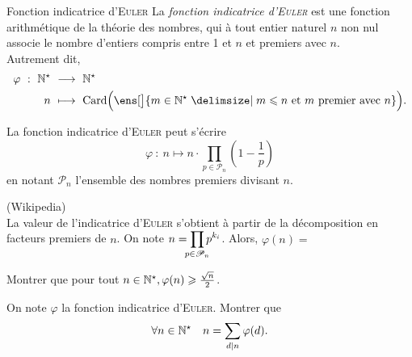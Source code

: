 \begin{defi}{Fonction indicatrice d'\textsc{Euler}}
    La \emph{fonction indicatrice d'\textsc{Euler}} est une fonction arithmétique de la théorie des nombres, qui à tout entier naturel $n$ non nul associe le nombre d'entiers compris entre 1 et $n$ et premiers avec $n$. \\
    Autrement dit, 
    \begin{alignat*}{2}
        \varphi\ :\ \Ne\ &\longrightarrow\ \Ne\\
        n\ &\longmapsto\ \mathrm{Card} \Big( \ens[\big]{m \in \Ne \tq m \leqslant n \text{ et } m \text{ premier avec } n } \Big).
    \end{alignat*}
\end{defi}


\begin{prop}{}
    La fonction indicatrice d'\textsc{Euler} peut s'écrire
    $$\varphi\ :\ n \longmapsto n \cdot \prod_{p \in \mathscr{P}_n} \left(1 - \frac{1}{p} \right)$$
    en notant $\mathscr{P}_n$ l'ensemble des nombres premiers divisant $n$.
\end{prop}

\begin{preuve}
    (Wikipedia) \\
    La valeur de l'indicatrice d'\textsc{Euler} s'obtient à partir de la décomposition en facteurs premiers de $n$. On note $n = \smashoperator{\prod\limits_{p \in \mathscr{P}_n}} p^{k_i}$. Alors, $\varphi(n) = $
\end{preuve}

\begin{exercice}
    Montrer que pour tout $n \in \mathbb{N}^\star, \varphi(n) \geqslant \frac{\sqrt{n}}{2}$.
\end{exercice}

\begin{exercice}
    On note $\varphi$ la fonction indicatrice d'\textsc{Euler}. Montrer que 
    $$\forall n \in \mathbb{N}^\star \quad n = \sum_{d|n} \varphi(d).$$
\end{exercice}

